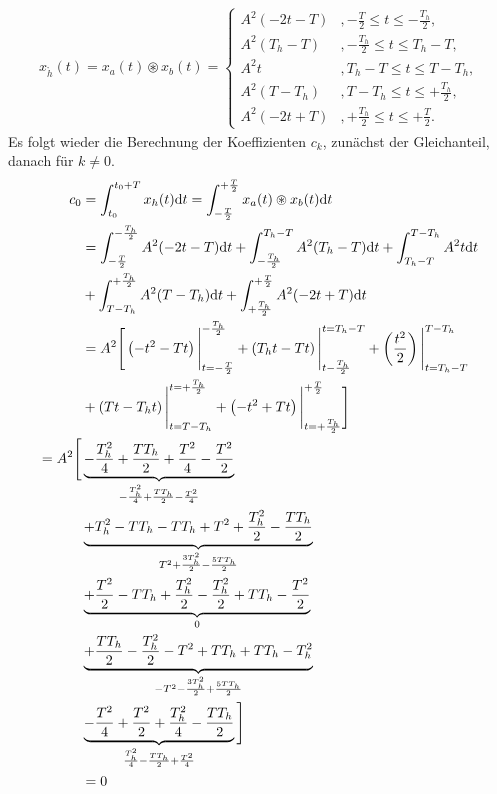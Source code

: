 \documentclass[11pt,a4paper,DIV=12]{scrartcl}
\begin{document}
%
%
\begin{align}
	x_{\mathring{h}}(t)=x_{a}(t)\circledast x_{b}(t)
	=
	\begin{cases}
		A^2(-2t-T)&,-\frac{T}{2}\leq t \leq -\frac{T_h}{2}, \\
		A^2(T_h-T)&,-\frac{T_h}{2}\leq t \leq T_h-T, \\
		A^2t &,T_h-T\leq t \leq T-T_h, \\
		A^2(T-T_h)&,T-T_h\leq t \leq +\frac{T_h}{2}, \\
		A^2(-2t+T)&,+\frac{T_h}{2}\leq t \leq +\frac{T}{2}.
	\end{cases}
\end{align}
%
%
Es folgt wieder die Berechnung der Koeffizienten $c_k$, zunächst der
Gleichanteil, danach für $k\neq 0$.
%
%
\begin{align}
	c_0&=\int_{t_0}^{t_0+T}x_{h}(t)\mathrm{d} t
	=\int_{-\frac{T}{2}}^{+\frac{T}{2}}x_{a}(t)\circledast x_{b}(t)\mathrm{d} t\nonumber \\
	&=\int_{-\frac{T}{2}}^{-\frac{T_h}{2}}A^2(-2t-T)\mathrm{d} t+\int_{-\frac{T_h}{2}}^{T_h-T}A^2(T_h-T)\mathrm{d} t+\int_{T_h-T}^{T-T_h}A^2t\mathrm{d} t\nonumber \\
	&+\int_{T-T_h}^{+\frac{T_h}{2}}A^2(T-T_h)\mathrm{d} t+\int_{+\frac{T_h}{2}}^{+\frac{T}{2}}A^2(-2t+T)\mathrm{d} t\nonumber \\
	&=A^2\Bigg[\left(-t^2-Tt\right)\Bigg |_{t=-\frac{T}{2}}^{-\frac{T_h}{2}}+\left(T_ht-Tt\right)\Bigg |_{t-\frac{T_h}{2}}^{t=T_h-T}+\left(\frac{t^2}{2}\right)\Bigg |_{t=T_h-T}^{T-T_h}\nonumber \\
	&+\left(Tt-T_ht\right)\Bigg |_{t=T-T_h}^{t=+\frac{T_h}{2}}+\left(-t^2+Tt\right)\Bigg |_{t=+\frac{T_h}{2}}^{+\frac{T}{2}}\Bigg]\nonumber \\
	=A^2\Bigg [&\underbrace{-\frac{T_h^2}{4}+\frac{TT_h}{2}+\frac{T^2}{4}-\frac{T^2}{2}}_{-\frac{T_h^2}{4}+\frac{TT_h}{2}-\frac{T^2}{4}}\nonumber \\
	&\underbrace{+T_h^2-TT_h-TT_h+T^2+\frac{T_h^2}{2} -\frac{TT_h}{2}}_{T^2+\frac{3T_h^2}{2}-\frac{5TT_h}{2}}\nonumber \\
	&\underbrace{+\frac{T^2}{2}-TT_h+\frac{T_h^2}{2}-\frac{T_h^2}{2}+TT_h-\frac{T^2}{2}}_{0}\nonumber \\
	&\underbrace{+\frac{TT_h}{2}-\frac{T_h^2}{2}-T^2+TT_h+TT_h-T_h^2}_{-T^2-\frac{3T_h^2}{2}+\frac{5TT_h}{2}}\nonumber \\
	&\underbrace{-\frac{T^2}{4}+\frac{T^2}{2}+\frac{T_h^2}{4}-\frac{TT_h}{2}}_{\frac{T_h^2}{4}-\frac{TT_h}{2}+\frac{T^2}{4}}\Bigg ]\nonumber \\
	&= 0
\end{align}
\end{document}
